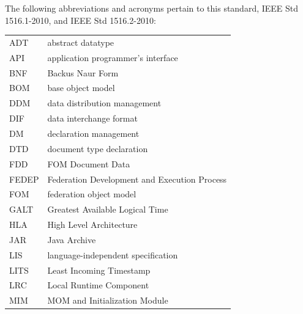 
\newpage
{}
\vspace{-5.2pt}

The following abbreviations and acronyms pertain to this standard, IEEE Std 1516.1-2010, and\linebreak
IEEE Std 1516.2-2010:

\vspace{0.7pt}
{\renewcommand{\arraystretch}{1.255}%
    \begin{tabular}{@{}p{0.528in}p{4.75in}@{}}
        ADT   & abstract datatype                            \\
        API   & application programmer's interface           \\
        BNF   & Backus Naur Form                             \\
        BOM   & base object model                            \\
        DDM   & data distribution management                 \\
        DIF   & data interchange format                      \\
        DM    & declaration management                       \\
        DTD   & document type declaration                    \\
        FDD   & FOM Document Data                            \\
        FEDEP & Federation Development and Execution Process \\
        FOM   & federation object model                      \\
        GALT  & Greatest Available Logical Time              \\
        HLA   & High Level Architecture                      \\
        JAR   & Java Archive                                 \\
        LIS   & language-independent specification           \\
        LITS  & Least Incoming Timestamp                     \\
        LRC   & Local Runtime Component                      \\
        MIM   & MOM and Initialization Module                \\

\end{tabular}}
